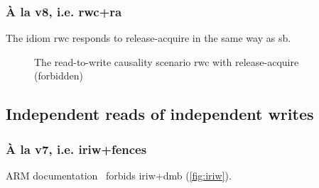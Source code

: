 \documentclass[a4paper]{article}
\begin{document}

\subsubsection{\`A la v8, i.e. \textsf{rwc+ra}}

The idiom {\sf rwc} responds to release-acquire in the same way as \textsf{sb}. 

\begin{figure}[!h]
\begin{center}
\end{center}
\vspace*{-5mm}
\caption{The read-to-write causality scenario \textsf{rwc} with release-acquire (forbidden) \label{fig:rwc-ra}}
\end{figure}


\clearpage

\subsection{Independent reads of independent writes}

\subsubsection{\`A la v7, i.e. \textsf{iriw+fences}}

ARM documentation~\cite{arm:cookbook} forbids \textsf{iriw+dmb}
(\cf\myfig\ref{fig:iriw}).
\end{document}
